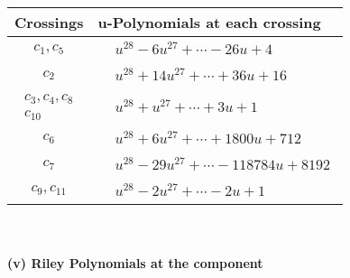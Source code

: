 \documentclass[1p]{elsarticle_modified}
\theoremstyle{definition}
\begin{document}
\begin{tabular}{m{50pt}|m{274pt}}
Crossings & \hspace{64pt}u-Polynomials at each crossing \\
\hline $$\begin{aligned}c_{1},c_{5}\end{aligned}$$&$\begin{aligned}
&u^{28}-6 u^{27}+\cdots-26 u+4
\end{aligned}$\\
\hline $$\begin{aligned}c_{2}\end{aligned}$$&$\begin{aligned}
&u^{28}+14 u^{27}+\cdots+36 u+16
\end{aligned}$\\
\hline $$\begin{aligned}c_{3},c_{4},c_{8}\\c_{10}\end{aligned}$$&$\begin{aligned}
&u^{28}+u^{27}+\cdots+3 u+1
\end{aligned}$\\
\hline $$\begin{aligned}c_{6}\end{aligned}$$&$\begin{aligned}
&u^{28}+6 u^{27}+\cdots+1800 u+712
\end{aligned}$\\
\hline $$\begin{aligned}c_{7}\end{aligned}$$&$\begin{aligned}
&u^{28}-29 u^{27}+\cdots-118784 u+8192
\end{aligned}$\\
\hline $$\begin{aligned}c_{9},c_{11}\end{aligned}$$&$\begin{aligned}
&u^{28}-2 u^{27}+\cdots-2 u+1
\end{aligned}$\\
\hline
\end{tabular}\\~\\
\newpage\renewcommand{\arraystretch}{1}
\flushleft \textbf{(v) Riley Polynomials at the component}\newline \\
\end{document}
